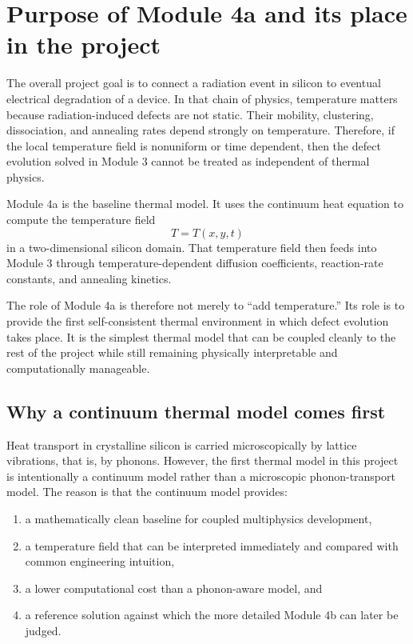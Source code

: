 \documentclass[11pt]{article}
\begin{document}
\section{Purpose of Module 4a and its place in the project}

The overall project goal is to connect a radiation event in silicon to eventual electrical degradation of a device. In that chain of physics, temperature matters because radiation-induced defects are not static. Their mobility, clustering, dissociation, and annealing rates depend strongly on temperature. Therefore, if the local temperature field is nonuniform or time dependent, then the defect evolution solved in Module 3 cannot be treated as independent of thermal physics.

Module 4a is the baseline thermal model. It uses the continuum heat equation to compute the temperature field
\begin{equation}
T = T(x,y,t)
\end{equation}
in a two-dimensional silicon domain. That temperature field then feeds into Module 3 through temperature-dependent diffusion coefficients, reaction-rate constants, and annealing kinetics.

The role of Module 4a is therefore not merely to ``add temperature.'' Its role is to provide the first self-consistent thermal environment in which defect evolution takes place. It is the simplest thermal model that can be coupled cleanly to the rest of the project while still remaining physically interpretable and computationally manageable.

\subsection{Why a continuum thermal model comes first}

Heat transport in crystalline silicon is carried microscopically by lattice vibrations, that is, by phonons. However, the first thermal model in this project is intentionally a continuum model rather than a microscopic phonon-transport model. The reason is that the continuum model provides:
\begin{enumerate}[label=\arabic*.]
    \item a mathematically clean baseline for coupled multiphysics development,
    \item a temperature field that can be interpreted immediately and compared with common engineering intuition,
    \item a lower computational cost than a phonon-aware model, and
    \item a reference solution against which the more detailed Module 4b can later be judged.
\end{enumerate}
\end{document}
